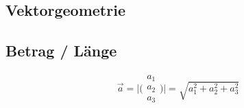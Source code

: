 \documentclass[a4paper,10pt]{article}
\title{\titleText}
\author{\authorText}
\date{\dateText}
\begin{document}
\maketitle
\clearpage
\tableofcontents
\clearpage

\begin{multicols}{4}

\section{Vektorgeometrie}
\subsection{Betrag / Länge}
\[
\vec{a} = \Bigg| \Bigg(
 \begin{matrix}
  a_1\\
  a_2\\
  a_3
 \end{matrix} \Bigg) \Bigg| = \sqrt{a_1^2 + a_2^2 + a_3^2}
\]

\end{multicols}
\end{document}

